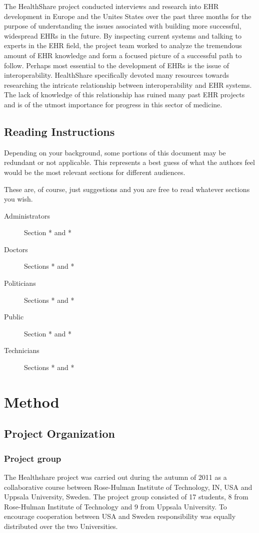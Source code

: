 \documentclass[14pt]{article}
\begin{document}
The HealthShare project conducted interviews and research into \gls{EHR} development in Europe and the Unites States over the past three months for the purpose of understanding the issues associated with building more successful, widespread \glspl{EHR} in the future. By inspecting current systems and talking to experts in the \gls{EHR} field, the project team worked to analyze the tremendous amount of \gls{EHR} knowledge and form a focused picture of a successful path to follow. Perhaps most essential to the development of \glspl{EHR} is the issue of interoperability. HealthShare specifically devoted many resources towards researching the intricate relationship between interoperability and \gls{EHR} systems. The lack of knowledge of this relationship has ruined many past \gls{EHR} projects and is of the utmost importance for progress in this sector of medicine.


\subsection{Reading Instructions}
Depending on your background, some portions of this document may be redundant or not applicable. This represents a best guess of what the authors feel would be the most relevant sections for different audiences.

These are, of course, just suggestions and you are free to read whatever sections you wish.

\begin{description}
\item[Administrators] Section * and *
\item[Doctors] Sections * and *
\item[Politicians] Sections * and *
\item[Public] Section * and *
\item[Technicians] Sections * and *
\end{description}

\newpage

\section{Method}
\label{sec:Method}

\subsection{Project Organization}
\subsubsection{Project group}
The Healthshare project was carried out during the autumn of 2011 as a collaborative course between Rose-Hulman Institute of Technology, IN, USA and Uppsala University, Sweden.
The project group consisted of 17 students, 8 from Rose-Hulman Institute of Technology and 9 from Uppsala University. To encourage cooperation between USA and Sweden responsibility was equally distributed over the two Universities.
\end{document}

